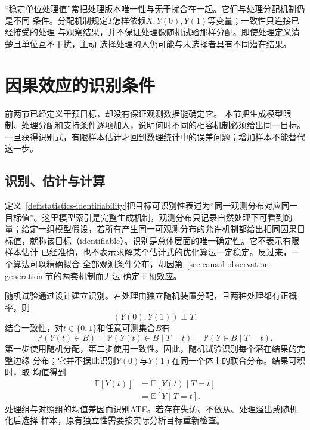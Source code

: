 “稳定单位处理值”常把处理版本唯一性与无干扰合在一起。它们与处理分配机制仍是不同
条件。分配机制规定\(T\)怎样依赖\(X,Y(0),Y(1)\)等变量；一致性只连接已经接受的处理
与观察结果，并不保证处理像随机试验那样分配。即使处理定义清楚且单位互不干扰，主动
选择处理的人仍可能与未选择者具有不同潜在结果。

\section{因果效应的识别条件}
\label{sec:causal-effect-identification}

前两节已经定义干预目标，却没有保证观测数据能确定它。
本节把生成模型限制、处理分配和支持条件逐项加入，说明何时不同的相容机制必须给出同一目标。
一旦获得识别式，有限样本估计才回到数理统计中的误差问题；增加样本不能替代这一步。

\subsection{识别、估计与计算}

定义~\ref{def:statistics-identifiability}把目标可识别性表述为“同一观测分布对应同一目标值”。这里模型索引是完整生成机制，观测分布只记录自然处理下可看到的量；给定一组模型假设，若所有产生同一可观测分布的允许机制都给出相同因果目标值，就称该目标（identifiable）。识别是总体层面的唯一确定性。它不表示有限样本估计
已经准确，也不表示求解某个估计式的优化算法一定稳定。反过来，一个算法可以精确拟合
全部观测条件分布，却因第~\ref{sec:causal-observation-generation}节的两套机制而无法
确定干预效应。

随机试验通过设计建立识别。若处理由独立随机装置分配，且两种处理都有正概率，则
\[
  (Y(0),Y(1))\perp T.
\]
结合一致性，对\(t\in\{0,1\}\)和任意可测集合\(B\)有
\begin{equation}
  \mathbb{P}(Y(t)\in B)
  =
  \mathbb{P}(Y(t)\in B\mid T=t)
  =
  \mathbb{P}(Y\in B\mid T=t).
  \label{eq:causal-randomization-marginal-distribution}
\end{equation}
第一步使用随机分配，第二步使用一致性。因此，随机试验识别每个潜在结果的完整边缘
分布；它并不据此识别\(Y(0)\)与\(Y(1)\)在同一个体上的联合分布。结果可积时，取
均值得到
\[
\begin{aligned}
  \mathbb{E}[Y(t)]
  &=
  \mathbb{E}[Y(t)\mid T=t]\\
  &=
  \mathbb{E}[Y\mid T=t].
\end{aligned}
\]
处理组与对照组的均值差因而识别ATE。若存在失访、不依从、处理溢出或随机化后选择
样本，原有独立性需要按实际分析目标重新检查。

